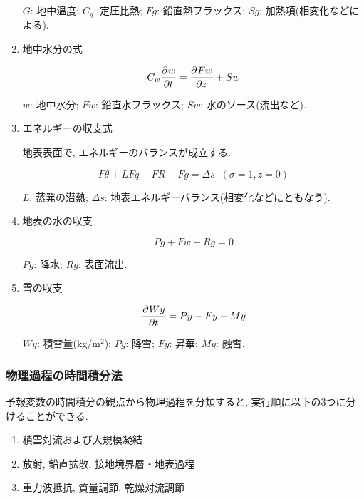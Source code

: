 \begin{enumerate}
$G$: 地中温度; $C_g$: 定圧比熱; 
$F{g}$: 鉛直熱フラックス;
$Sg$; 加熱項(相変化などによる).

\item 地中水分の式

\begin{equation}
  C_w \DP{w}{t} = \DP{Fw}{z} + Sw
\end{equation}

$w$: 地中水分; 
$F{w}$: 鉛直水フラックス;
$Sw$; 水のソース(流出など).

\item エネルギーの収支式

地表表面で, エネルギーのバランスが成立する.

\begin{equation}
    F{\theta} + L F{q} + F{R} - F{g} = \Delta s \; \; (\sigma=1, z=0)
\end{equation}

$L$: 蒸発の潜熱;
$\Delta s$: 地表エネルギーバランス(相変化などにともなう).

\item 地表の水の収支

\begin{equation}
  Pg + Fw - Rg = 0
\end{equation}

$Pg$: 降水;
$Rg$: 表面流出.

\item 雪の収支

\begin{equation}
  \DP{Wy}{t} = Py - Fy - My
\end{equation}

$Wy$: 積雪量(kg/m$^2$);
$Py$: 降雪;
$Fy$: 昇華;
$My$: 融雪.

\end{enumerate}

\subsubsection{物理過程の時間積分法}

予報変数の時間積分の観点から物理過程を分類すると,
実行順に以下の3つに分けることができる.
\begin{enumerate}
\item 積雲対流および大規模凝結
\item 放射, 鉛直拡散, 接地境界層・地表過程       
\item 重力波抵抗, 質量調節, 乾燥対流調節
\end{enumerate}

